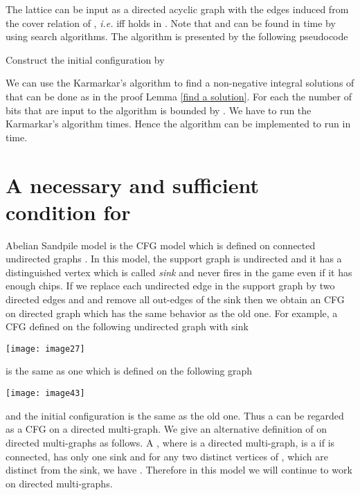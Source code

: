 \documentclass{article}
\theoremstyle{definition}
\begin{document}
The lattice  can be input as a directed acyclic graph with the edges induced from the cover relation of , \emph{i.e. }  iff  holds in . Note that  and  can be found in  time by using search algorithms.
The algorithm is presented by the following pseudocode\\
\begin{algorithm}[H]

\;
\;
Construct the initial configuration  by

\end{algorithm}
We can use the Karmarkar's algorithm \cite{K84} to find a non-negative integral solutions  of  that can be done as in the proof Lemma \ref{find a solution}. For each  the number of bits that are input to the algorithm is bounded by . We have to run the Karmarkar's algorithm  times. Hence the algorithm can be implemented to run in  time.
\section{A necessary and sufficient condition for }
\label{fourth section}
Abelian Sandpile model is the CFG model which is defined on connected undirected graphs \cite{BTW87}. In this model, the support graph is undirected and it has a distinguished vertex which is called \emph{sink} and never fires in the game even if it has enough chips. If we replace each undirected edge  in the support graph by two directed edges  and  and remove all out-edges of the sink then we obtain an CFG on directed graph which has the same behavior as the old one. For example, a CFG defined on the following undirected graph with sink 
\begin{center}
\texttt{[image: image27]}
\end{center}
is the same as one which is defined on the following graph
\begin{center}
\texttt{[image: image43]}
\end{center}
and the initial configuration is the same as the old one. Thus a  can be regarded as a CFG on a directed multi-graph. We give an alternative definition of  on directed multi-graphs as follows. A , where  is a directed multi-graph, is a  if  is connected,  has only one sink  and for any two distinct vertices  of , which are distinct from the sink, we have . Therefore in this model we will continue to work on directed multi-graphs. 
\end{document}
